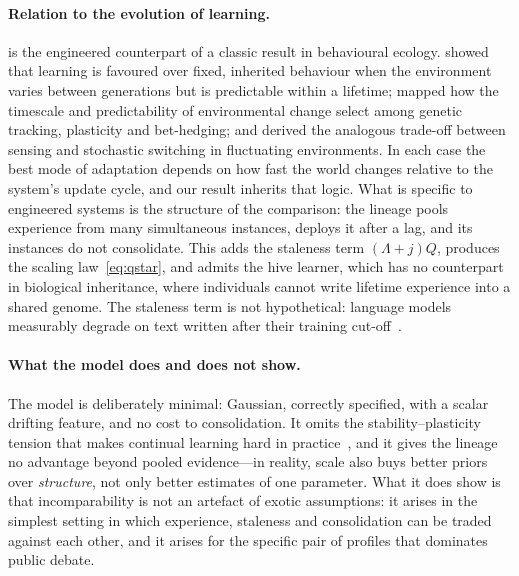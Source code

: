 \documentclass[11pt]{article}
\theoremstyle{plain}
\theoremstyle{definition}
\theoremstyle{remark}
\begin{document}
\paragraph{Relation to the evolution of learning.}
 is the engineered counterpart of a classic result in behavioural ecology. \citet{stephens1991change} showed that learning is favoured over fixed, inherited behaviour when the environment varies between generations but is predictable within a lifetime; \citet{botero2015evolutionary} mapped how the timescale and predictability of environmental change select among genetic tracking, plasticity and bet-hedging; and \citet{kussell2005phenotypic} derived the analogous trade-off between sensing and stochastic switching in fluctuating environments. In each case the best mode of adaptation depends on how fast the world changes relative to the system's update cycle, and our result inherits that logic. What is specific to engineered systems is the structure of the comparison: the lineage pools experience from many simultaneous instances, deploys it after a lag, and its instances do not consolidate. This adds the staleness term $(\Lambda+j)Q$, produces the scaling law~\eqref{eq:qstar}, and admits the hive learner, which has no counterpart in biological inheritance, where individuals cannot write lifetime experience into a shared genome. The staleness term is not hypothetical: language models measurably degrade on text written after their training cut-off~\citep{lazaridou2021mind}.

\paragraph{What the model does and does not show.}
The model is deliberately minimal: Gaussian, correctly specified, with a scalar drifting feature, and no cost to consolidation. It omits the stability--plasticity tension that makes continual learning hard in practice~\citep{mccloskey1989catastrophic,kirkpatrick2017overcoming,parisi2019continual}, and it gives the lineage no advantage beyond pooled evidence---in reality, scale also buys better priors over \emph{structure}, not only better estimates of one parameter. What it does show is that incomparability is not an artefact of exotic assumptions: it arises in the simplest setting in which experience, staleness and consolidation can be traded against each other, and it arises for the specific pair of profiles that dominates public debate.

\end{document}
